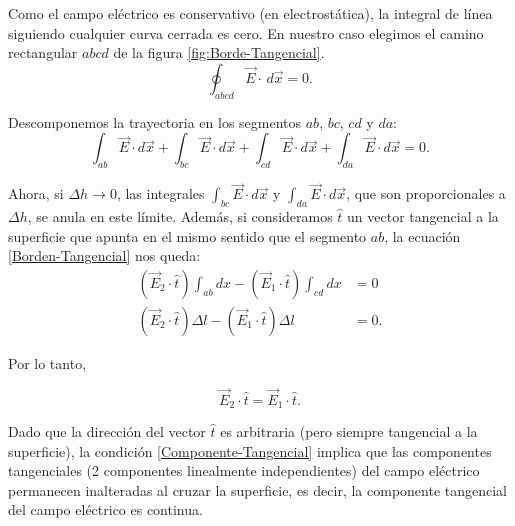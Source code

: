 Como el campo eléctrico es conservativo (en electrostática), la integral de línea siguiendo cualquier curva cerrada es cero. En nuestro caso elegimos el camino rectangular $abcd$ de la figura \ref{fig:Borde-Tangencial}.
$$\oint_{abcd} \Vec{E} \cdot \,d\Vec{x} = 0.$$

 Descomponemos la trayectoria en los segmentos $ab$, $bc$, $cd$ y $da$:
\begin{equation}
\int_{ab} \Vec{E} \cdot d\Vec{x} + \int_{bc} \Vec{E} \cdot d\Vec{x} + \int_{cd} \Vec{E} \cdot d\Vec{x} + \int_{da} \Vec{E} \cdot d\Vec{x} = 0.   \label{Borden-Tangencial}
\end{equation}

Ahora, si $\Delta h \to 0$, las integrales $\int_{bc} \Vec{E} \cdot d\Vec{x}$ y  $\int_{da} \Vec{E} \cdot d\Vec{x}$, que son proporcionales a $\Delta h$, se anula en este límite. Además, si consideramos $\hat{t}$ un vector tangencial a la superficie que apunta en el mismo sentido que el segmento $ab$, la ecuación \eqref{Borden-Tangencial} nos queda:
\begin{align*}
    (\Vec{E}_2 \cdot \hat{t}) \int_{ab} dx - (\Vec{E}_1 \cdot \hat{t}) \int_{cd} dx &= 0 \\
    (\Vec{E}_2 \cdot \hat{t}) \Delta l - (\Vec{E}_1 \cdot \hat{t}) \Delta l &= 0 .
\end{align*}

Por lo tanto, 
\begin{shaded}
\begin{equation}
    \Vec{E}_2 \cdot \hat{t} = \Vec{E}_1 \cdot \hat{t}.    \label{Componente-Tangencial}
\end{equation}
\end{shaded}

Dado que la dirección del vector $\hat{t}$ es arbitraria (pero siempre tangencial a la superficie), la condición \eqref{Componente-Tangencial} implica que las componentes tangenciales (2 componentes linealmente independientes) del campo eléctrico permanecen inalteradas al cruzar la superficie, es decir, la componente tangencial del campo eléctrico es continua.

